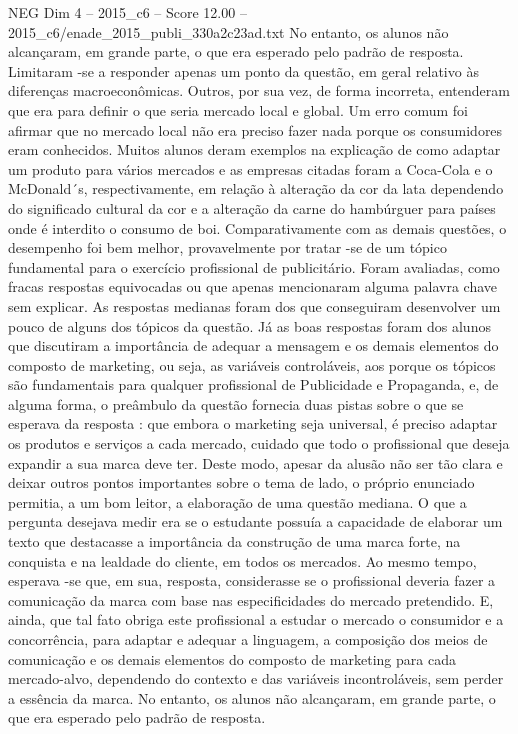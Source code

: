 \begin{textsample}{NEG Dim 4 – 2015\_c6 – Score 12.00 – 2015\_c6/enade\_2015\_publi\_330a2c23ad.txt}
No entanto, os alunos não alcançaram, em grande parte, o que era esperado pelo padrão de resposta.
Limitaram -se a responder apenas um ponto da questão, em geral relativo às diferenças macroeconômicas.
Outros, por sua vez, de forma incorreta, entenderam que era para definir o que seria mercado local e global.
Um erro comum foi afirmar que no mercado local não era preciso fazer nada porque os consumidores eram conhecidos.
Muitos alunos deram exemplos na explicação de como adaptar um produto para vários mercados e as empresas citadas foram a Coca-Cola e o McDonald´s, respectivamente, em relação à alteração da cor da lata dependendo do significado cultural da cor e a alteração da carne do hambúrguer para países onde é interdito o consumo de boi.
Comparativamente com as demais questões, o desempenho foi bem melhor, provavelmente por tratar -se de um tópico fundamental para o exercício profissional de publicitário.
Foram avaliadas, como fracas respostas equivocadas ou que apenas mencionaram alguma palavra chave sem explicar.
As respostas medianas foram dos que conseguiram desenvolver um pouco de alguns dos tópicos da questão.
Já as boas respostas foram dos alunos que discutiram a importância de adequar a mensagem e os demais elementos do composto de marketing, ou seja, as variáveis controláveis, aos porque os tópicos são fundamentais para qualquer profissional de Publicidade e Propaganda, e, de alguma forma, o preâmbulo da questão fornecia duas pistas sobre o que se esperava da resposta : que embora o marketing seja universal, é preciso adaptar os produtos e serviços a cada mercado, cuidado que todo o profissional que deseja expandir a sua marca deve ter.
Deste modo, apesar da alusão não ser tão clara e deixar outros pontos importantes sobre o tema de lado, o próprio enunciado permitia, a um bom leitor, a elaboração de uma questão mediana.
O que a pergunta desejava medir era se o estudante possuía a capacidade de elaborar um texto que destacasse a importância da construção de uma marca forte, na conquista e na lealdade do cliente, em todos os mercados.
Ao mesmo tempo, esperava -se que, em sua, resposta, considerasse se o profissional deveria fazer a comunicação da marca com base nas especificidades do mercado pretendido.
E, ainda, que tal fato obriga este profissional a estudar o mercado o consumidor e a concorrência, para adaptar e adequar a linguagem, a composição dos meios de comunicação e os demais elementos do composto de marketing para cada mercado-alvo, dependendo do contexto e das variáveis incontroláveis, sem perder a essência da marca.
No entanto, os alunos não alcançaram, em grande parte, o que era esperado pelo padrão de resposta.

\end{textsample}
